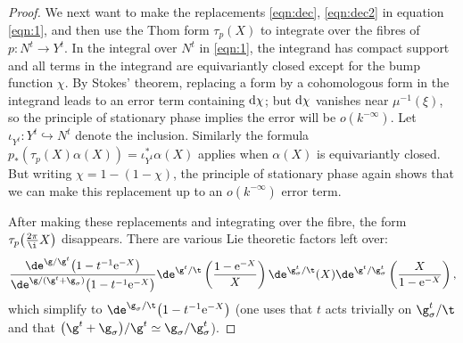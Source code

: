\begin{proof}
We next want to make the replacements \eqref{eqn:dec}, \eqref{eqn:dec2} in equation \eqref{eqn:1}, and then use the Thom form $\tau_p(X)$ to integrate over the fibres of $p\colon N^t \rightarrow Y^t$. In the integral over $N^t$ in \eqref{eqn:1}, the integrand has compact support and all terms in the integrand are equivariantly closed except for the bump function $\chi$. By Stokes' theorem, replacing a form by a cohomologous form in the integrand leads to an error term containing ${\rm d}\chi$; but ${\rm d}\chi$ vanishes near $\mu^{-1}(\xi)$, so the principle of stationary phase implies the error will be $o(k^{-\infty})$. Let $\iota_{Y^t}\colon Y^t\hookrightarrow N^t$ denote the inclusion. Similarly the formula $p_\ast(\tau_p(X)\alpha(X))=\iota_{Y^t}^\ast \alpha(X)$ applies when $\alpha(X)$ is equivariantly closed. But writing $\chi=1-(1-\chi)$, the principle of stationary phase again shows that we can make this replacement up to an $o(k^{-\infty})$ error term.

After making these replacements and integrating over the fibre, the form $\tau_p\big(\tfrac{2\pi}{\i}X\big)$ disappears. There are various Lie theoretic factors left over:
\[ \frac{\de^{\g/\g^t}\big(1-t^{-1}{\rm e}^{-X}\big)}{\de^{\g/(\g^t+\g_\sigma)}\big(1-t^{-1}{\rm e}^{-X}\big)}\de^{\g^t/\t}\left(\frac{1-{\rm e}^{-X}}{X}\right)\de^{\g_\sigma^t/\t}(X)\de^{\g^t/\g_\sigma^t}\left(\frac{X}{1-{\rm e}^{-X}}\right),\]
which simplify to $\de^{\g_\sigma/\t}\big(1-t^{-1}{\rm e}^{-X}\big)$ (one uses that $t$ acts trivially on $\g_\sigma^t/\t$ and that $\big(\g^t+\g_\sigma\big)/\g^t\simeq \g_\sigma/\g_\sigma^t$).
\end{proof}


